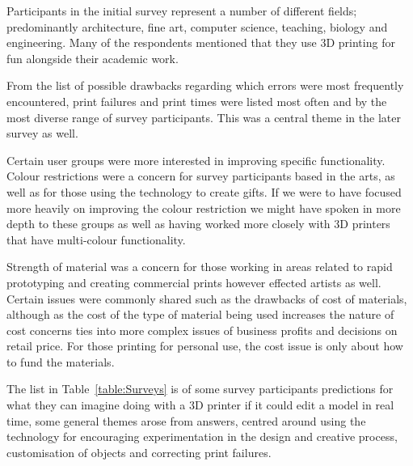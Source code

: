 \documentclass[11pt]{report} %
\begin{document}
Participants in the initial survey represent a number of different fields; predominantly architecture, fine art, computer science, teaching, biology and engineering. Many of the respondents mentioned that they use 3D printing for fun alongside their academic work. 

From the list of possible drawbacks regarding which errors were most frequently encountered, print failures and print times were listed most often and by the most diverse range of survey participants. This was a central theme in the later survey as well.

Certain user groups were more interested in improving specific functionality. Colour restrictions were a concern for survey participants based in the arts, as well as for those using the technology to create gifts. If we were to have focused more heavily on improving the colour restriction we might have spoken in more depth to these groups as well as having worked more closely with 3D printers that have multi-colour functionality. 

Strength of material was a concern for those working in areas related to rapid prototyping and creating commercial prints however effected artists as well. Certain issues were commonly shared such as the drawbacks of cost of materials, although as the cost of the type of material being used increases the nature of cost concerns ties into more complex issues of business profits and decisions on retail price. For those printing for personal use, the cost issue is only about how to fund the materials. 

The list in Table~\ref{table:Surveys} is of some survey participants predictions for what they can imagine doing with a 3D printer if it could edit a model in real time, some general themes arose from answers, centred around using the technology for encouraging experimentation in the design and creative process, customisation of objects and correcting print failures.
\end{document}
